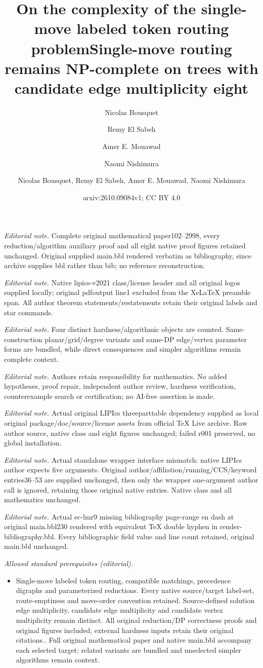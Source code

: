 \documentclass[a4paper,USenglish,thm-restate]{lipics-v2021}
\title{On the complexity of the single-move labeled token routing problem}
\author{Nicolas Bousquet}{CNRS, Univ.\ Lyon, Universit\'e Lyon 1, INSA Lyon, LIRIS UMR CNRS 5205, F-69621 Villeurbanne, France}{nicolas.bousquet@cnrs.fr}{https://orcid.org/0000-0003-0170-0503}{}
\author{Remy {El Sabeh}}{David R. Cheriton School of Computer Science, University of Waterloo, Waterloo, ON, Canada}{relsabeh@uwaterloo.ca}{https://orcid.org/0000-0002-3786-4035}{}
\author{Amer E. Mouawad}{American University of Beirut, Beirut, Lebanon \and David R. Cheriton School of Computer Science, University of Waterloo, Waterloo, ON, Canada}{aa368@aub.edu.lb}{}{}
\author{Naomi Nishimura}{David R. Cheriton School of Computer Science, University of Waterloo, Waterloo, ON, Canada}{nishi@uwaterloo.ca}{}{}
\title{Single-move routing remains NP-complete on trees with candidate edge multiplicity eight}
\author{Nicolas Bousquet, Remy El Sabeh, Amer E. Mouawad, Naomi Nishimura}
\date{arxiv:2610.09084v1; CC BY 4.0}
\theoremstyle{problemstyle}
\begin{document}
\maketitle
\noindent\textit{Editorial note.} Complete original mathematical paper102--2998, every reduction/algorithm auxiliary proof and all eight native proof figures retained unchanged. Original supplied main.bbl rendered verbatim as bibliography, since archive supplies bbl rather than bib; no reference reconstruction.\par\medskip
\noindent\textit{Editorial note.} Native lipics-v2021 class/license header and all original logos supplied locally; original pdfoutput line1 excluded from the XeLaTeX preamble span. All author theorem statements/restatements retain their original labels and star commands.\par\medskip
\noindent\textit{Editorial note.} Four distinct hardness/algorithmic objects are counted. Same-construction planar/grid/degree variants and same-DP edge/vertex parameter forms are bundled, while direct consequences and simpler algorithms remain complete context.\par\medskip
\noindent\textit{Editorial note.} Authors retain responsibility for mathematics. No added hypotheses, proof repair, independent author review, hardness verification, counterexample search or certification; no AI-free assertion is made.\par\medskip
\noindent\textit{Editorial note.} Actual original LIPIcs threeparttable dependency supplied as local original package/doc/source/license assets from official TeX Live archive. Raw author source, native class and eight figures unchanged; failed r001 preserved, no global installation.\par\medskip
\noindent\textit{Editorial note.} Actual standalone wrapper interface mismatch: native LIPIcs author expects five arguments. Original author/affiliation/running/CCS/keyword entries36--53 are supplied unchanged, then only the wrapper one-argument author call is ignored, retaining those original native entries. Native class and all mathematics unchanged.\par\medskip
\noindent\textit{Editorial note.} Actual ec-lmr9 missing bibliography page-range en dash at original main.bbl230 rendered with equivalent TeX double hyphen in render-bibliography.bbl. Every bibliographic field value and line count retained, original main.bbl unchanged.\par\medskip
\noindent\textit{Allowed standard prerequisites (editorial).}\begin{itemize}
\item Single-move labeled token routing, compatible matchings, precedence digraphs and parameterized reductions. Every native source/target label-set, route-emptiness and move-order convention retained. Source-defined solution edge multiplicity, candidate edge multiplicity and candidate vertex multiplicity remain distinct. All original reduction/DP correctness proofs and original figures included; external hardness inputs retain their original citations.. Full original mathematical paper and native main.bbl accompany each selected target; related variants are bundled and unselected simpler algorithms remain context.
\end{itemize}\medskip
\end{document}

